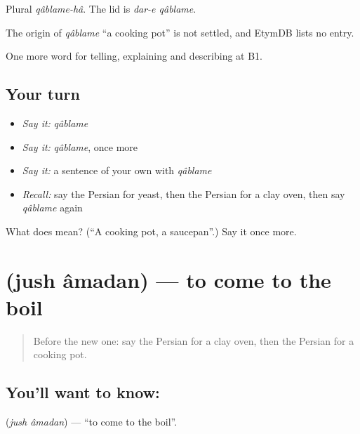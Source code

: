 Plural \emph{qâblame-hâ}. The lid is \emph{dar-e qâblame}.

\begin{cousinweb}
The origin of \emph{qâblame} \textquotedblleft{}a cooking pot\textquotedblright{} is not settled, and EtymDB lists no entry.
\end{cousinweb}

\begin{grammarlens}[title={What you've built}]
One more word for telling, explaining and describing at B1.
\end{grammarlens}

\subsection*{Your turn}
\begin{itemize}
\raggedright
  \item \emph{Say it:} \emph{qâblame}
  \item \emph{Say it:} \emph{qâblame}, once more
  \item \emph{Say it:} a sentence of your own with \emph{qâblame}
  \item \emph{Recall:} say the Persian for yeast, then the Persian for a clay oven, then say \emph{qâblame} again
\end{itemize}

\begin{tcolorbox}[breakable,colback=teal!4,colframe=teal!35!black,title={Before you move on}]
What does  mean? (\textquotedblleft{}A cooking pot, a saucepan\textquotedblright{}.) Say it once more.
\end{tcolorbox}
\section[\texorpdfstring{\fa{جوش} \fa{آمدن} (jush âmadan)}{جوش آمدن (jush âmadan)}]{  (jush âmadan) — to come to the boil}

\label{lesson:FA-C358-jush-amadan}



\begin{quote}
Before the new one: say the Persian for a clay oven, then the Persian for a cooking pot.
\end{quote}

\subsection*{You'll want to know:  }
\textbf{ } (\emph{jush âmadan}) — \textquotedblleft{}to come to the boil\textquotedblright{}.

